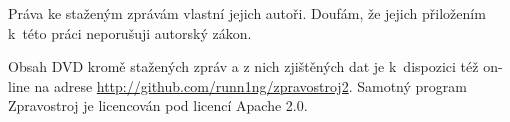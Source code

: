 \documentclass[12pt,a4paper]{report}
\let\openright=\clearpage
\begin{document}
Práva ke staženým zprávám vlastní jejich autoři. Doufám, že jejich přiložením k~této práci neporušuji autorský zákon.

Obsah DVD kromě stažených zpráv a z nich zjištěných dat je k~dispozici též on-line na adrese \url{http://github.com/runn1ng/zpravostroj2}. Samotný program Zpravostroj je licencován pod licencí Apache 2.0.


\openright
\end{document}
